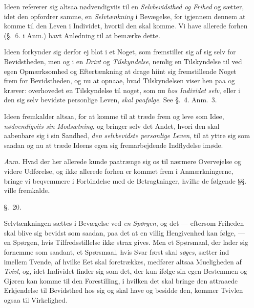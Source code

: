 \documentclass[12pt,a4paper]{book}
\newcommand{\apage}[1]{\marginnote{\footnotesize\textit{[#1]}}}
\begin{document}
Ideen refererer sig altsaa nødvendigviis til en \emph{Selvbevidsthed og Frihed} og
sætter, idet den opfordrer samme, en \emph{Selvtænkning} i Bevægelse, for igjennem
dennem at komme til den Leven i Individet, hvortil den skal komme. Vi have allerede
forhen (§.~6. i Anm.) havt Anledning til at bemærke dette.

Ideen forkynder sig derfor ej blot i et Noget, som fremstiller sig af sig selv for
Bevidstheden, men og i en \emph{Drivt} og \emph{Tilskyndelse}, nemlig en Tilskyndelse til
ved egen Opmærksomhed og Eftertænkning at drage hiint sig fremstillende Noget frem
for Bevidstheden, og nu at opnaae, hvad Tilskyndelsen viser hen paa og kræver:
overhovedet en Tilskyndelse til noget, som nu \emph{hos Individet selv}, eller i
den sig selv bevidste personlige Leven, \emph{skal paafølge}. See §.~4. Anm.~3.

Ideen fremkalder altsaa, for at komme til at træde frem og leve som Idee,
\emph{nødvendigviis sin Modsætning}, og bringer selv det Andet, hvori den skal
aabenbare sig i sin Sandhed, \emph{den selvbevidste personlige Leven}, til at
yttre sig som saadan og nu at træde Ideens egen sig fremarbejdende Indflydelse
imøde.

\apage{162} \emph{Anm.} Hvad der her allerede kunde paatrænge sig os til nærmere Overvejelse
og videre Udførelse, og ikke allerede forhen er kommet frem i Anmærkningerne,
bringe vi beqvemmere i Forbindelse med de Betragtninger, hvilke de følgende §§.
ville fremkalde.

\begin{center}\large\S.~20.\end{center}

Selvtænkningen sættes i Bevægelse ved \emph{en Spørgen}, og det --- eftersom
Friheden skal blive sig bevidst som saadan, paa det at en villig Hengivenhed kan
følge, --- en Spørgen, hvis Tilfredsstillelse ikke strax gives. Men et Spørsmaal,
der lader sig fornemme som saadant, et Spørsmaal, hvis Svar først skal
\emph{søges}, sætter ind imellem Tvende, af hvilke Eet skal
foretrækkes, medfører altsaa Mueligheden af \emph{Tvivl}, og, idet Individet
finder sig som det, der kun ifølge sin egen Bestemmen og Gjøren kan komme til den
Forestilling, i hvilken det skal bringe den attraaede Erkjendelse til Bevidsthed
hos sig og skal have og besidde den, kommer Tvivlen ogsaa til Virkelighed.
\end{document}
